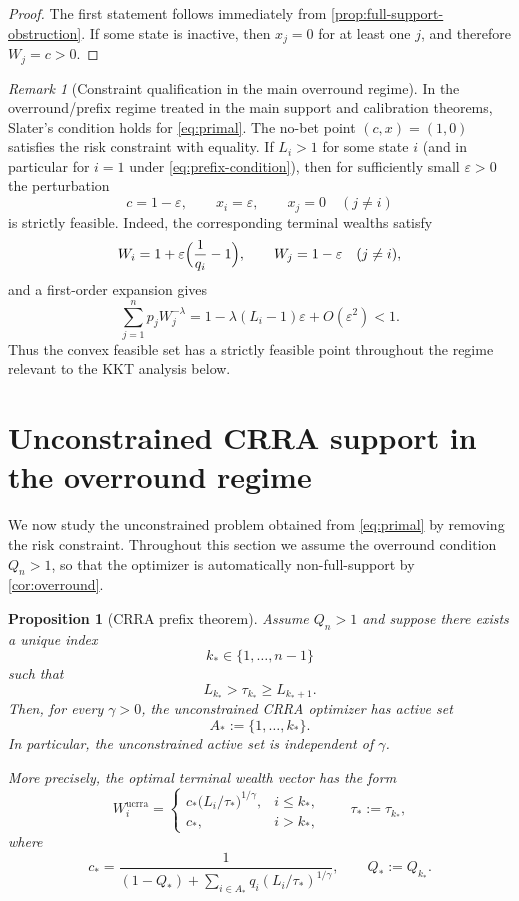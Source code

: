 \documentclass[11pt]{article}
\newtheorem{proposition}[theorem]{Proposition}
\theoremstyle{definition}
\theoremstyle{remark}
\newtheorem{remark}[theorem]{Remark}
\newcommand{\1}{\mathbf{1}}
\begin{document}
\begin{proof}
The first statement follows immediately from \cref{prop:full-support-obstruction}. If some state is inactive, then $x_j=0$ for at least one $j$, and therefore $W_j=c>0$.
\end{proof}

\begin{remark}[Constraint qualification in the main overround regime]
\label{rem:slater}
In the overround/prefix regime treated in the main support and calibration theorems, Slater's condition holds for \eqref{eq:primal}. The no-bet point $(c,x)=(1,0)$ satisfies the risk constraint with equality. If $L_i>1$ for some state $i$ (and in particular for $i=1$ under \eqref{eq:prefix-condition}), then for sufficiently small $\varepsilon>0$ the perturbation
\[
c=1-\varepsilon,
\qquad
x_i=\varepsilon,
\qquad
x_j=0\quad (j\ne i)
\]
is strictly feasible. Indeed, the corresponding terminal wealths satisfy
\[
W_i=1+\varepsilon\Bigl(\frac{1}{q_i}-1\Bigr),
\qquad
W_j=1-\varepsilon\quad (j\ne i),
\]
and a first-order expansion gives
\[
\sum_{j=1}^n p_jW_j^{-\lambda}
=1-\lambda(L_i-1)\varepsilon+O(\varepsilon^2)<1.
\]
Thus the convex feasible set has a strictly feasible point throughout the regime relevant to the KKT analysis below.
\end{remark}

\section{Unconstrained CRRA support in the overround regime}
\label{sec:unconstrained-crra}

We now study the unconstrained problem obtained from \eqref{eq:primal} by removing the risk constraint. Throughout this section we assume the overround condition $Q_n>1$, so that the optimizer is automatically non-full-support by \cref{cor:overround}.

\begin{proposition}[CRRA prefix theorem]
\label{prop:crra-prefix}
Assume $Q_n>1$ and suppose there exists a unique index
\[
k_*\in\{1,\dots,n-1\}
\]
such that
\begin{equation}
\label{eq:prefix-condition}
L_{k_*}>\tau_{k_*}\ge L_{k_*+1}.
\end{equation}
Then, for every $\gamma>0$, the unconstrained CRRA optimizer has active set
\[
A_*:=\{1,\dots,k_*\}.
\]
In particular, the unconstrained active set is independent of $\gamma$.

More precisely, the optimal terminal wealth vector has the form
\[
W_i^{\mathrm{ucrra}}=
\begin{cases}
c_*\bigl(L_i/\tau_*\bigr)^{1/\gamma}, & i\le k_*,\\[2mm]
c_*, & i>k_*,
\end{cases}
\qquad
\tau_*:=\tau_{k_*},
\]
where
\[
c_*=
\frac{1}{(1-Q_*)+\sum_{i\in A_*} q_i(L_i/\tau_*)^{1/\gamma}},
\qquad
Q_*:=Q_{k_*}.
\]
\end{proposition}
\end{document}
